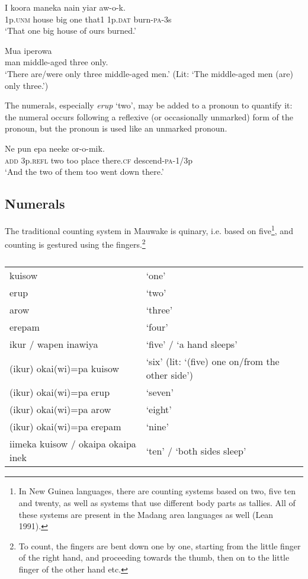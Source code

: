 \ea%
\label{ex:x87}
\gll I koora maneka  nain yiar aw-o-k. \\
1p.\textsc{unm} house big one that1 1p.\textsc{dat} burn-\textsc{pa}-3s\\
\glt`That one big house of ours burned.'
\z

\ea%
\label{ex:x442}
\gll Mua iperowa   \\
man middle-aged three only.\\
\glt`There are/were only three middle-aged men.' (Lit: `The middle-aged men (are) only three.') 
\z

The numerals, especially \textit{erup} `two', may be added to a pronoun to quantify it: the numeral occurs following a reflexive (or occasionally unmarked) form of the pronoun, but the pronoun is used like an unmarked pronoun.

\ea%
\label{ex:x89}
\gll Ne   pun epa neeke or-o-mik. \\
\textsc{add} 3p.\textsc{refl} two too place there.\textsc{cf} descend-\textsc{pa}-1/3p\\
\glt`And the two of them too went down there.'
\z

\subsection{Numerals}
{}
The traditional counting system in Mauwake is quinary, i.e. based on five\footnote{In New Guinea languages, there are counting systems based on two, five ten and twenty, as well as systems that use different body parts as tallies. All of these systems are present in the Madang area languages as well ({Lean 1991}).}, and counting is gestured using the fingers.\footnote{To count, the fingers are bent down one by one, starting from the little finger of the right hand, and proceeding towards the thumb, then on to the little finger of the other hand etc.} 

\begin{table}
\caption{}
\label{} 
\begin{tabular}{ll}
kuisow &`one'\\
erup &`two'\\
arow &`three'\\
erepam &`four'\\
ikur / wapen inawiya &`five' / `a hand sleeps'\\
(ikur) okai(wi)=pa kuisow &`six' (lit: `(five) one on/from the other side')\\
(ikur) okai(wi)=pa erup &`seven'\\
(ikur) okai(wi)=pa arow &`eight'\\
(ikur) okai(wi)=pa erepam &`nine'\\
iimeka kuisow / okaipa okaipa inek &`ten' / `both sides sleep'\\
\end{tabular}
\end{table}


